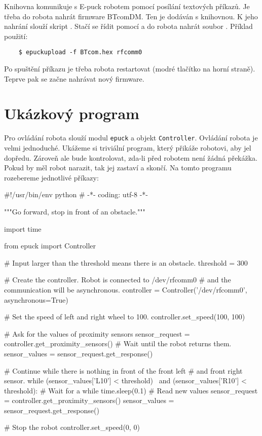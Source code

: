     Knihovna komunikuje s E-puck robotem pomocí posílání textových příkazů. Je
    třeba do robota nahrát firmware BTcomDM. Ten je dodáván s knihovnou.
    K jeho nahrání slouží skript  \cite{epuckupload}. Stačí
    se řídit pomocí  a do robota nahrát soubor .
    Příklad použití:

    \begin{verbatim}
    $ epuckupload -f BTcom.hex rfcomm0
    \end{verbatim}

    Po spuštění příkazu je třeba robota restartovat (modré tlačítko na horní
    straně). Teprve pak se začne nahrávat nový firmware.

\section{Ukázkový program}
\label{ukazkovy_program}

    Pro ovládání robota slouží modul {\tt epuck} a objekt {\tt Controller}.
    Ovládání robota je velmi jednoduché. Ukážeme si triviální program, který
    přikáže robotovi, aby jel dopředu. Zároveň ale bude kontrolovat, zda-li
    před robotem není žádná překážka. Pokud by měl robot narazit, tak jej
    zastaví a skončí. Na tomto programu rozebereme jednotlivé příkazy:

\begin{mylisting}
\begin{pyc}
#!/usr/bin/env python
# -*- coding: utf-8 -*-

"""Go forward, stop in front of an obstacle."""

import time

from epuck import Controller

# Input larger than the threshold means there is an obstacle.
threshold = 300

# Create the controller. Robot is connected to /dev/rfcomm0
# and the communication will be asynchronous.
controller = Controller('/dev/rfcomm0', asynchronous=True)

# Set the speed of left and right wheel to 100.
controller.set_speed(100, 100)

# Ask for the values of proximity sensors
sensor_request = controller.get_proximity_sensors()
# Wait until the robot returns them.
sensor_values = sensor_request.get_response()

# Continue while there is nothing in front of the front left
# and front right sensor.
while (sensor_values['L10'] < threshold) \
       and (sensor_values['R10'] < threshold):
    # Wait for a while
    time.sleep(0.1)
    # Read new values
    sensor_request = controller.get_proximity_sensors()
    sensor_values = sensor_request.get_response()

# Stop the robot
controller.set_speed(0, 0)
\end{pyc}
\label{lst:simple_example}
\end{mylisting}

